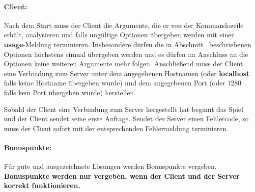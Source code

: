 \paragraph{Client:}
Nach dem Start muss der Client die Argumente, die er von der Kommandozeile erhält, analysieren
und falls ungültige Optionen übergeben werden mit einer \textbf{usage}-Meldung terminieren.
Insbesondere dürfen die in Abschnitt~ beschriebenen Optionen höchstens einmal
übergeben werden und es dürfen im Anschluss an die Optionen keine weiteren Argumente mehr folgen.
Anschließend muss der Client eine Verbindung zum Server unter dem angegebenen Hostnamen (oder \textbf{localhost}
falls keine Hostname übergeben wurde) und dem angegebenen Port (oder 1280 falls kein Port übergeben wurde)
herstellen.

Sobald der Client eine Verbindung zum Server hergestellt hat beginnt das Spiel
und der Client sendet seine erste Anfrage.
Sendet der Server einen Fehlercode, so muss der Client sofort mit der
entsprechenden Fehlermeldung terminieren.

\paragraph{Bonuspunkte:} Für gute und ausgezeichnete Lösungen werden Bonuspunkte vergeben.
\textbf{Bonuspunkte werden nur vergeben, wenn der Client und der Server korrekt funktionieren.}

